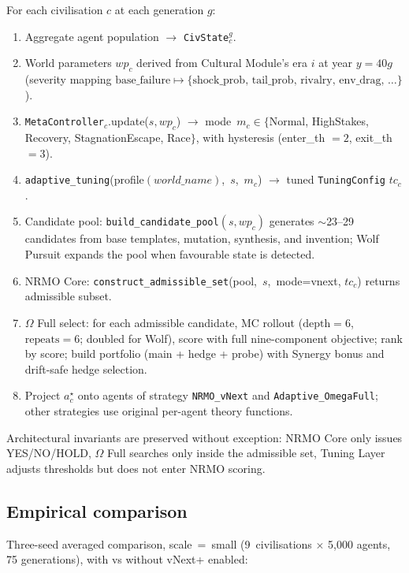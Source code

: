 For each civilisation $c$ at each generation $g$:
\begin{enumerate}
\item Aggregate agent population $\to$ \texttt{CivState}$_c^g$.
\item World parameters $\mathit{wp}_c$ derived from Cultural Module's
  era $i$ at year $y = 40g$ (severity mapping
  $\mathrm{base\_failure} \mapsto \{\text{shock\_prob, tail\_prob,
  rivalry, env\_drag, \ldots}\}$).
\item \texttt{MetaController}$_c$.update($s, \mathit{wp}_c$) $\to$
  mode~$m_c \in \{$Normal, HighStakes, Recovery, StagnationEscape,
  Race$\}$, with hysteresis (enter\_th $=2$, exit\_th $=3$).
\item \texttt{adaptive\_tuning}(profile$(\mathit{world\_name})$,~$s$,~$m_c$)
  $\to$ tuned \texttt{TuningConfig} $\mathit{tc}_c$.
\item Candidate pool: \texttt{build\_candidate\_pool}$(s, \mathit{wp}_c)$
  generates $\sim$23--29 candidates from base templates, mutation,
  synthesis, and invention; Wolf Pursuit expands the pool when
  favourable state is detected.
\item NRMO Core: \texttt{construct\_admissible\_set}(pool,~$s$,~mode=vnext,
  $\mathit{tc}_c$) returns admissible subset.
\item $\Omega$ Full select: for each admissible candidate, MC rollout
  ($\mathrm{depth}=6$, $\mathrm{repeats}=6$; doubled for Wolf), score
  with full nine-component objective; rank by score; build portfolio
  (main + hedge + probe) with Synergy bonus and drift-safe hedge
  selection.
\item Project $a^\star_c$ onto agents of strategy
  \texttt{NRMO\_vNext} and \texttt{Adaptive\_OmegaFull}; other
  strategies use original per-agent theory functions.
\end{enumerate}

Architectural invariants are preserved without exception: NRMO Core only
issues YES/NO/HOLD, $\Omega$ Full searches only inside the admissible
set, Tuning Layer adjusts thresholds but does not enter NRMO scoring.

\subsection{Empirical comparison}

Three-seed averaged comparison, scale~=~small (9~civilisations $\times$
5{,}000 agents, 75 generations), with vs without vNext+ enabled:

